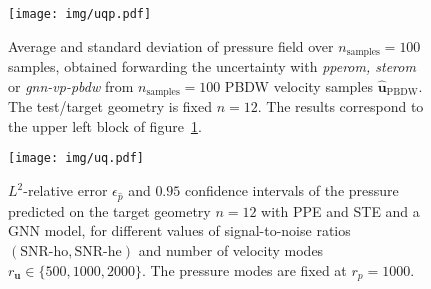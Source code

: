\begin{figure}[!htp]
  \centering
  \texttt{[image: img/uqp.pdf]}\\
  \caption{Average and standard deviation of pressure field over $n_{\text{samples}}=100$ samples, obtained forwarding the uncertainty with \textit{pperom, sterom} or \textit{gnn-vp-pbdw} from $n_{\text{samples}}=100$ PBDW velocity samples $\widehat{\mathbf{u}}_{\text{PBDW}}$. The test/target geometry is fixed $n=12$. The results correspond to the upper left block of figure~\ref{fig:uq_p}.}
  \label{fig:uq_p}
\end{figure}


\begin{figure}[!htp]
  \centering
  \texttt{[image: img/uq.pdf]}\\
  \caption{$L^2$-relative error $\epsilon_{\widehat{p}}$ and $0.95$ confidence intervals of the pressure predicted on the target geometry $n=12$ with PPE and STE and a GNN model, for different values of signal-to-noise ratios $(\text{SNR-ho}, \text{SNR-he})$ and number of velocity modes $r_{\mathbf u}\in\{500, 1000, 2000\}$. The pressure modes are fixed at $r_p=1000$.}
  \label{fig:uq_cfd}
\end{figure}
